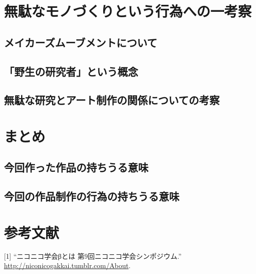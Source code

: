 \chapter{無駄なモノづくりという行為への一考察}\label{ux7121ux99c4ux306aux30e2ux30ceux3065ux304fux308aux3068ux3044ux3046ux884cux70baux3078ux306eux4e00ux8003ux5bdf}

\section{メイカーズムーブメントについて}\label{ux30e1ux30a4ux30abux30fcux30baux30e0ux30fcux30d6ux30e1ux30f3ux30c8ux306bux3064ux3044ux3066}

\section{「野生の研究者」という概念}\label{ux91ceux751fux306eux7814ux7a76ux8005ux3068ux3044ux3046ux6982ux5ff5}

\section{無駄な研究とアート制作の関係についての考察}\label{ux7121ux99c4ux306aux7814ux7a76ux3068ux30a2ux30fcux30c8ux5236ux4f5cux306eux95a2ux4fc2ux306bux3064ux3044ux3066ux306eux8003ux5bdf}

\chapter{まとめ}\label{ux307eux3068ux3081}

\section{今回作った作品の持ちうる意味}\label{ux4ecaux56deux4f5cux3063ux305fux4f5cux54c1ux306eux6301ux3061ux3046ux308bux610fux5473}

\section{今回の作品制作の行為の持ちうる意味}\label{ux4ecaux56deux306eux4f5cux54c1ux5236ux4f5cux306eux884cux70baux306eux6301ux3061ux3046ux308bux610fux5473}

\chapter*{参考文献}\label{ux53c2ux8003ux6587ux732e}

\hypertarget{refs}{}
\hypertarget{ref-niconicogakkai}{}
{[}1{]} ``ニコニコ学会βとは 第9回ニコニコ学会シンポジウム.''
\url{http://niconicogakkai.tumblr.com/About}.
